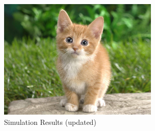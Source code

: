 \begin{figure}
    \centering
    \includegraphics[width=3.0in]{cat.jpg}
    \caption{Simulation Results (updated)}
    \label{simulationfigure}
\end{figure}
